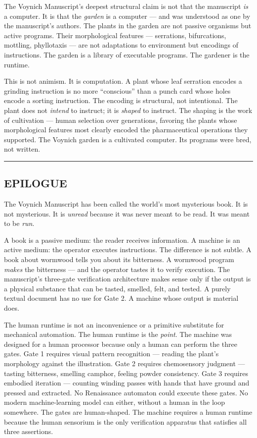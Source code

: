 The Voynich Manuscript's deepest structural claim is not that the
manuscript \emph{is} a computer. It is that the \emph{garden} is a
computer --- and was understood as one by the manuscript's authors. The
plants in the garden are not passive organisms but active programs.
Their morphological features --- serrations, bifurcations, mottling,
phyllotaxis --- are not adaptations to environment but encodings of
instructions. The garden is a library of executable programs. The
gardener is the runtime.

This is not animism. It is computation. A plant whose leaf serration
encodes a grinding instruction is no more ``conscious'' than a punch
card whose holes encode a sorting instruction. The encoding is
structural, not intentional. The plant does not \emph{intend} to
instruct; it is \emph{shaped} to instruct. The shaping is the work of
cultivation --- human selection over generations, favoring the plants
whose morphological features most clearly encoded the pharmaceutical
operations they supported. The Voynich garden is a cultivated computer.
Its programs were bred, not written.

\begin{center}\rule{0.5\linewidth}{0.5pt}\end{center}

\hypertarget{epilogue}{%
\subsection{EPILOGUE}\label{epilogue}}

The Voynich Manuscript has been called the world's most mysterious book.
It is not mysterious. It is \emph{unread} because it was never meant to
be read. It was meant to be \emph{run}.

A book is a passive medium: the reader receives information. A machine
is an active medium: the operator executes instructions. The difference
is not subtle. A book about wormwood tells you about its bitterness. A
wormwood program \emph{makes} the bitterness --- and the operator tastes
it to verify execution. The manuscript's three-gate verification
architecture makes sense only if the output is a physical substance that
can be tasted, smelled, felt, and tested. A purely textual document has
no use for Gate 2. A machine whose output is material does.

The human runtime is not an inconvenience or a primitive substitute for
mechanical automation. The human runtime is the \emph{point}. The
machine was designed for a human processor because only a human can
perform the three gates. Gate 1 requires visual pattern recognition ---
reading the plant's morphology against the illustration. Gate 2 requires
chemosensory judgment --- tasting bitterness, smelling camphor, feeling
powder consistency. Gate 3 requires embodied iteration --- counting
winding passes with hands that have ground and pressed and extracted. No
Renaissance automaton could execute these gates. No modern
machine-learning model can either, without a human in the loop
somewhere. The gates are human-shaped. The machine requires a human
runtime because the human sensorium is the only verification apparatus
that satisfies all three assertions.

